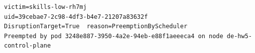 \begin{Verbatim}[fontsize=\scriptsize]
victim=skills-low-rh7mj
uid=39cebae7-2c98-4df3-b4e7-21207a83632f
DisruptionTarget=True  reason=PreemptionByScheduler
Preempted by pod 3248e887-3950-4a2e-94eb-e88f1aeeeca4 on node de-hw5-control-plane
\end{Verbatim}
